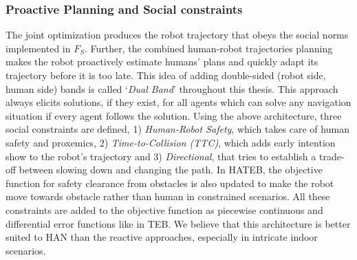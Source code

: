 \subsubsection{Proactive Planning and Social constraints}
The joint optimization produces the robot trajectory that obeys the social norms implemented in $F_S$. Further, the combined human-robot trajectories planning makes the robot proactively estimate humans' plans and quickly adapt its trajectory before it is too late. This idea of adding double-sided (robot side, human side) bands is called `{\textit{Dual Band}}' throughout this thesis. This approach always elicits solutions, if they exist, for all agents which can solve any navigation situation if every agent follows the solution. 
Using the above architecture, three social constraints are defined, 1) \textit{Human-Robot Safety}, which takes care of human safety and proxemics, 2) \textit{Time-to-Collision (TTC)}, which adds early intention show to the robot's trajectory and 3) \textit{Directional}, that tries to establish a trade-off between slowing down and changing the path. In HATEB, the objective function for safety clearance from obstacles is also updated to make the robot move towards obstacle rather than human in constrained scenarios. All these constraints are added to the objective function as piecewise continuous and differential error functions like in TEB. We believe that this architecture is better suited to HAN than the reactive approaches, especially in intricate indoor scenarios.




